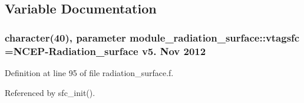 \subsection{Variable Documentation}
\subsubsection[{\texorpdfstring{vtagsfc}{vtagsfc}}]{\setlength{\rightskip}{0pt plus 5cm}character(40), parameter module\+\_\+radiation\+\_\+surface\+::vtagsfc =\textquotesingle{}N\+C\+EP-\/Radiation\+\_\+surface v5. Nov 2012 \textquotesingle{}\hspace{0.3cm}{\ttfamily [private]}}\hypertarget{namespacemodule__radiation__surface_ab0b8c10a0fb6be2644fdf91e3fe1fc5c}{}\label{namespacemodule__radiation__surface_ab0b8c10a0fb6be2644fdf91e3fe1fc5c}


Definition at line 95 of file radiation\+\_\+surface.\+f.



Referenced by sfc\+\_\+init().

